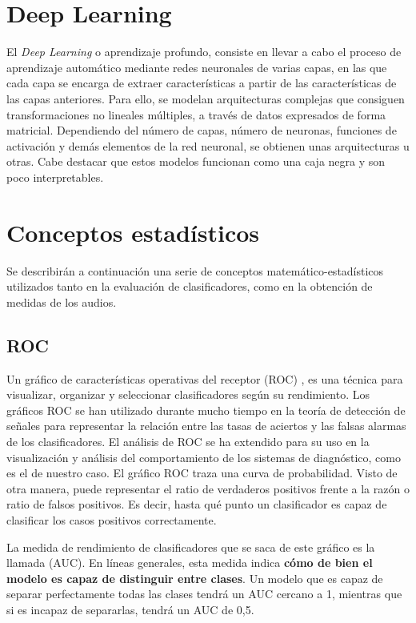 \section{Deep Learning}
El \textit{Deep Learning} o aprendizaje profundo, consiste en llevar a cabo el proceso de aprendizaje automático mediante redes neuronales de varias capas, en las que cada capa se encarga de extraer características a partir de las características de las capas anteriores. Para ello, se modelan arquitecturas complejas que consiguen transformaciones no lineales múltiples, a través de datos expresados de forma matricial. Dependiendo del número de capas, número de neuronas, funciones de activación y demás elementos de la red neuronal, se obtienen unas arquitecturas u otras. Cabe destacar que estos modelos funcionan como una caja negra y son poco interpretables.

\section{Conceptos estadísticos}
Se describirán a continuación una serie de conceptos matemático-estadísticos utilizados tanto en la evaluación de clasificadores, como en la obtención de medidas de los audios.
\subsection{ROC}
Un gráfico de características operativas del receptor (ROC) \cite{roc}, es una técnica para visualizar, organizar y seleccionar clasificadores según su rendimiento. Los gráficos ROC se han utilizado durante mucho tiempo en la teoría de detección de señales para representar la relación entre las tasas de aciertos y las falsas alarmas de los clasificadores. El análisis de ROC se ha extendido para su uso en la visualización y análisis del comportamiento de los sistemas de diagnóstico, como es el de nuestro caso. El gráfico ROC traza una curva de probabilidad. Visto de otra manera, puede representar el ratio de verdaderos positivos frente a la razón o ratio de falsos positivos. Es decir, hasta qué punto un clasificador es capaz de clasificar los casos positivos correctamente.

La medida de rendimiento de clasificadores que se saca de este gráfico es la llamada  (AUC). En líneas generales, esta medida indica \textbf{cómo de bien el modelo es capaz de distinguir entre clases}.  Un modelo que es capaz de separar perfectamente todas las clases tendrá un AUC cercano a 1, mientras que si es incapaz de separarlas, tendrá un AUC de 0,5. 




